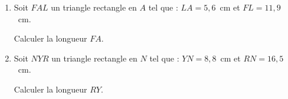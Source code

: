 \begin{minipage}{0.99\linewidth}

\exo


 

    \begin{enumerate}
    \item Soit $FAL$ un triangle rectangle en $A$ tel que :
    $LA=5,6$~cm et $FL=11,9$~cm.\par
      Calculer la longueur $FA$.

    \item Soit $NYR$ un triangle rectangle en $N$ tel que : 
    $YN=8,8$~cm et $RN=16,5$~cm.\par
      Calculer la longueur $RY$.

    \end{enumerate}

\end{minipage}

\vspace{0.5cm}
